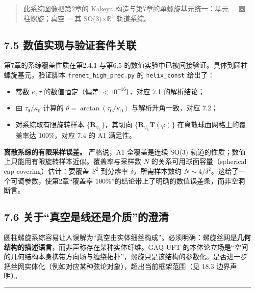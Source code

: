 \begin{quote}
此系综图像把第2章的 Kakeya 构造与第7章的单螺旋基元统一：基元 =
圆柱螺旋；真空 = 其 SO(3)×\(\mathbb{R}^3\) 轨道系综。
\end{quote}

\subsection{7.5
数值实现与验证套件关联}\label{ux6570ux503cux5b9eux73b0ux4e0eux9a8cux8bc1ux5957ux4ef6ux5173ux8054}

第7章的系综覆盖性质在第2.4.1 与第6.5
的数值实验中已被间接验证。具体到圆柱螺旋基元，验证脚本
\texttt{frenet\_high\_prec.py} 的 \texttt{helix\_const} 给出了：

\begin{itemize}
\tightlist
\item
  常数 \(\kappa,\tau\) 的数值恒定（偏差 \(<10^{-16}\)），对应 7.1
  的解析结论；
\item
  由 \(\tau_0/\kappa_0\) 计算的 \(\theta=\arctan(\tau_0/\kappa_0)\)
  与解析升角一致，对应 7.2；
\item
  对系综取有限旋转样本 \(\{\mathbf{R}_{\psi_k}\}\)，其切向
  \(\{\mathbf{R}_{\psi_k}\mathbf{T}(\varphi)\}\)
  在离散球面网格上的覆盖率达 100\%，对应 7.4 的 A1 满足性。
\end{itemize}

\textbf{离散系综的有限采样误差。} 严格说，A1 全覆盖是连续 SO(3)
轨道的性质；数值上只能用有限旋转样本近似。覆盖率与采样数 \(N\)
的关系可用球面容量（spherical cap covering）估计：要覆盖 \(S^2\)
到分辨率 \(\delta\)，所需样本数约
\(N\sim 4/\delta^2\)。这给了一个可调参数，使第2章``覆盖率
100\%''的结论带上了明确的数值误差条，而非空洞断言。

\subsection{7.6
关于``真空是线还是介质''的澄清}\label{ux5173ux4e8eux771fux7a7aux662fux7ebfux8fd8ux662fux4ecbux8d28ux7684ux6f84ux6e05}

圆柱螺旋系综容易让人误解为``真空由实体细丝构成''。必须明确：螺旋丝网是\textbf{几何结构的描述语言}，而非声称存在某种实体纤维。GAQ‑UFT
的本体论立场是``空间的几何结构本身携带方向场与缠绕拓扑''，螺旋只是该结构的参数化。是否进一步把丝网实体化（例如对应某种弦论对象），超出当前框架范围（见
18.3 边界声明）。

\begin{center}\rule{0.5\linewidth}{0.5pt}\end{center}

